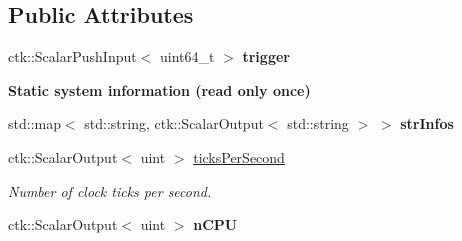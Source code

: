 \subsection*{Public Attributes}
\begin{DoxyCompactItemize}
\item 
ctk\+::\+Scalar\+Push\+Input$<$ uint64\+\_\+t $>$ {\bfseries trigger}
\end{DoxyCompactItemize}
\begin{Indent}{\bf Static system information (read only once)}\par
\begin{DoxyCompactItemize}
\item 
std\+::map$<$ std\+::string, ctk\+::\+Scalar\+Output$<$ std\+::string $>$ $>$ {\bfseries str\+Infos}\hypertarget{classSystemInfoModule_ae52c7cda303fc72110074058c7b549b1}{}\label{classSystemInfoModule_ae52c7cda303fc72110074058c7b549b1}

\item 
ctk\+::\+Scalar\+Output$<$ uint $>$ \hyperlink{classSystemInfoModule_a999b7826b0f2adefb480a8410bf883ff}{ticks\+Per\+Second}
\begin{DoxyCompactList}\small\item\em Number of clock ticks per second. \end{DoxyCompactList}\item 
ctk\+::\+Scalar\+Output$<$ uint $>$ {\bfseries n\+C\+PU}
\end{DoxyCompactItemize}
\end{Indent}
